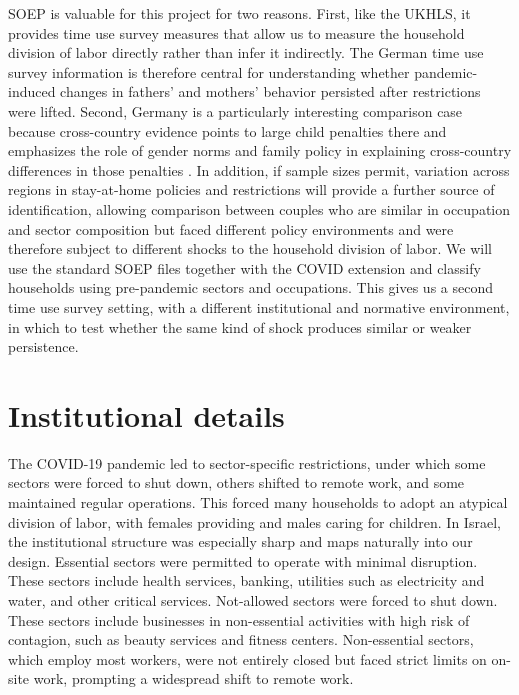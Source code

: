 \documentclass[12pt]{article}
\begin{document}
SOEP is valuable for this project for two reasons. First, like the UKHLS, it provides time use survey measures that allow us to measure the household division of labor directly rather than infer it indirectly. The German time use survey information is therefore central for understanding whether pandemic-induced changes in fathers' and mothers' behavior persisted after restrictions were lifted. Second, Germany is a particularly interesting comparison case because cross-country evidence points to large child penalties there and emphasizes the role of gender norms and family policy in explaining cross-country differences in those penalties \citep{kleven2019childpenalties}. In addition, if sample sizes permit, variation across regions in stay-at-home policies and restrictions will provide a further source of identification, allowing comparison between couples who are similar in occupation and sector composition but faced different policy environments and were therefore subject to different shocks to the household division of labor. We will use the standard SOEP files together with the COVID extension and classify households using pre-pandemic sectors and occupations. This gives us a second time use survey setting, with a different institutional and normative environment, in which to test whether the same kind of shock produces similar or weaker persistence.

\section{Institutional details}

The COVID-19 pandemic led to sector-specific restrictions, under which some sectors were forced to shut down, others shifted to remote work, and some maintained regular operations. This forced many households to adopt an atypical division of labor, with females providing and males caring for children. In Israel, the institutional structure was especially sharp and maps naturally into our design. Essential sectors were permitted to operate with minimal disruption. These sectors include health services, banking, utilities such as electricity and water, and other critical services. Not-allowed sectors were forced to shut down. These sectors include businesses in non-essential activities with high risk of contagion, such as beauty services and fitness centers. Non-essential sectors, which employ most workers, were not entirely closed but faced strict limits on on-site work, prompting a widespread shift to remote work.
\end{document}
